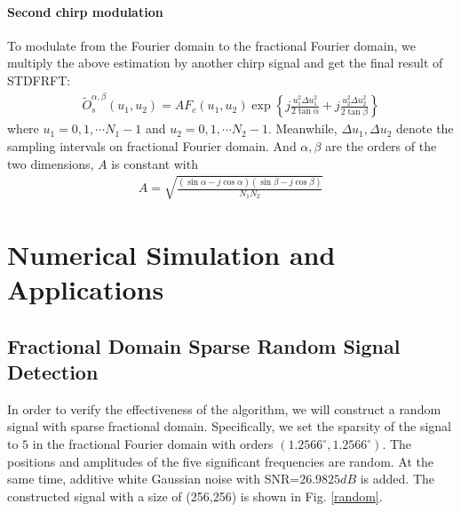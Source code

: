 \documentclass[conference]{IEEEtran}
\begin{document}
\paragraph{Second chirp modulation} 
To modulate from the Fourier domain to the fractional Fourier domain, we multiply the above estimation by another chirp signal and get the final result of STDFRFT:
\begin{align}
		{\tilde O}_s^{\alpha ,\beta }({u_1},{u_2}) = A{F_c}({u_1},{u_2})\exp \left\{ {j\frac{{u_1^2\Delta u_1^2}}{{2\tan \alpha }} + j\frac{{u_2^2\Delta u_2^2}}{{2\tan \beta }}} \right\}		
\end{align}
where ${u_1} = 0,1, \cdots {N_1} - 1$ and ${u_2} = 0,1, \cdots {N_2} - 1$. Meanwhile, $\Delta {u_1},\Delta {u_2}$ denote the sampling intervals on fractional Fourier domain. And $\alpha ,\beta$ are the orders of the two dimensions, $A$ is constant with
\begin{align}
	A = \sqrt {\frac{{(\sin \alpha  - j\cos \alpha )(\sin \beta  - j\cos \beta )}}{{{N_1}{N_2}}}} 
\end{align}
 
\section{Numerical Simulation and Applications} 
 
\subsection{Fractional Domain Sparse Random Signal Detection} 

In order to verify the effectiveness of the algorithm, we will construct a random signal with sparse fractional domain. Specifically, we set the sparsity of the signal to $5$ in the fractional Fourier domain with orders $(1.2566^{\circ},1.2566^{\circ})$. The positions and amplitudes of the five significant frequencies are random. At the same time, additive white Gaussian noise with SNR=$26.9825dB$ is added. The constructed signal with a size of (256,256) is shown in Fig. \ref{random}. 
\end{document}
